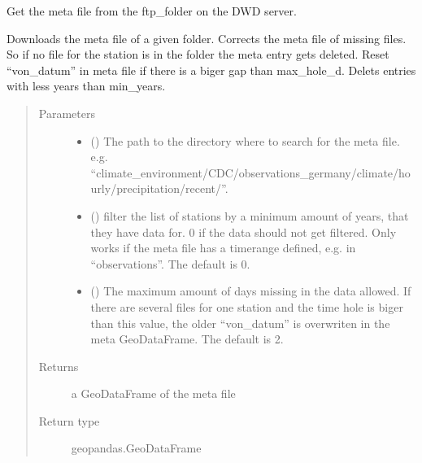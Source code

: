 \documentclass[letterpaper,10pt,english]{sphinxmanual}
\begin{document}
\begin{fulllineitems}
\label{\detokenize{weatherDB.lib.max_fun:weatherDB.lib.max_fun.import_DWD.get_dwd_meta}}
\sphinxAtStartPar
Get the meta file from the ftp\_folder on the DWD server.

\sphinxAtStartPar
Downloads the meta file of a given folder.
Corrects the meta file of missing files. So if no file for the station is
in the folder the meta entry gets deleted.
Reset “von\_datum” in meta file if there is a biger gap than max\_hole\_d.
Delets entries with less years than min\_years.
\begin{quote}\begin{description}
\item[{Parameters}] \leavevmode\begin{itemize}
\item {} 
\sphinxAtStartPar
{} () \textendash{} The path to the directory where to search for the meta file.
e.g. “climate\_environment/CDC/observations\_germany/climate/hourly/precipitation/recent/”.

\item {} 
\sphinxAtStartPar
{} (\sphinxstyleliteralemphasis{\sphinxupquote{, }}) \textendash{} filter the list of stations by a minimum amount of years,
that they have data for. 0 if the data should not get filtered.
Only works if the meta file has a timerange defined,
e.g. in “observations”.
The default is 0.

\item {} 
\sphinxAtStartPar
{} () \textendash{} The maximum amount of days missing in the data allowed.
If there are several files for one station and the time hole is biger
than this value, the older “von\_datum” is overwriten
in the meta GeoDataFrame.
The default is 2.

\end{itemize}

\item[{Returns}] \leavevmode
\sphinxAtStartPar
a GeoDataFrame of the meta file

\item[{Return type}] \leavevmode
\sphinxAtStartPar
geopandas.GeoDataFrame

\end{description}\end{quote}

\end{fulllineitems}
\end{document}
